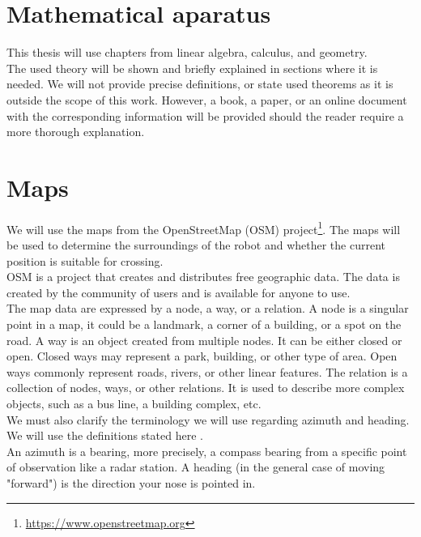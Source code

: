 \section{Mathematical aparatus}
    This thesis will use chapters from linear algebra, calculus, and geometry.\\
    The used theory will be shown and briefly explained in sections where it is needed. We will not provide precise definitions, or state used theorems as it is outside the scope of this work. However, a book, a paper, or an online document with the corresponding information will be provided should the reader require a more thorough explanation.\\

\section{Maps}
    We will use the maps from the OpenStreetMap (OSM) project\footnote{\url{https://www.openstreetmap.org}}. The maps will be used to determine the surroundings of the robot and whether the current position is suitable for crossing.\\
    OSM is a project that creates and distributes free geographic data. The data is created by the community of users and is available for anyone to use. \cite{OSMwiki}\\
    The map data are expressed by a node, a way, or a relation. A node is a singular point in a map, it could be a landmark, a corner of a building, or a spot on the road. A way is an object created from multiple nodes. It can be either closed or open. Closed ways may represent a park, building, or other type of area. Open ways commonly represent roads, rivers, or other linear features. The relation is a collection of nodes, ways, or other relations. It is used to describe more complex objects, such as a bus line, a building complex, etc.\\
    We must also clarify the terminology we will use regarding azimuth and heading. We will use the definitions stated here \cite{heading}.\\
    An azimuth is a bearing, more precisely, a compass bearing from a specific point of observation like a radar station. A heading (in the general case of moving "forward") is the direction your nose is pointed in.
